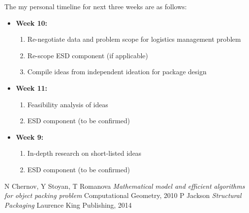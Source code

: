 \documentclass[a4paper, fleqn]{article}
\begin{document}
The my personal timeline for next three weeks are as follows:
\begin{itemize}
\item \textbf{Week 10:}    \begin{enumerate}
\item Re-negotiate data and problem scope for logistics management problem
\item Re-scope ESD component (if applicable)
\item Compile ideas from independent ideation for package design
\end{enumerate}
\item \textbf{Week 11:}     \begin{enumerate}
\item Feasibility analysis of ideas
\item ESD component (to  be confirmed)
\end{enumerate}
\item \textbf{Week 9:}    \begin{enumerate}
\item In-depth research on short-listed ideas
\item ESD component (to be confirmed)
\end{enumerate}
\end{itemize}
\begin{thebibliography}{9}
N Chernov, Y Stoyan, T Romanova
\textit{Mathematical model and efficient algorithms for object packing problem}
Computational Geometry, 2010
P Jackson
\textit{Structural Packaging}
Laurence King Publishing, 2014
\end{thebibliography}
\end{document}
